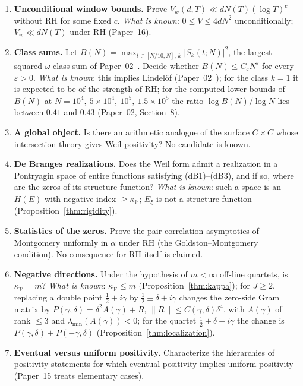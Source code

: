 \documentclass[11pt]{amsart}
\theoremstyle{definition}
\theoremstyle{remark}
\newcommand{\half}{\tfrac{1}{2}}
\newcommand{\om}{\omega}
\newcommand{\gam}{\gamma}
\newcommand{\eps}{\varepsilon}
\newcommand{\kV}{\kappa_{\mathcal V}}
\begin{document}
\begin{enumerate}[label=\textbf{OP\arabic*.}]

\item \textbf{Unconditional window bounds.}
Prove $V_w(d,T)\ll dN(T)(\log T)^c$ without RH for some fixed $c$.
\emph{What is known}: $0\le V\le4dN^2$ unconditionally; $V_w\ll dN(T)$ under RH
(Paper~16).

\item \textbf{Class sums.}
Let $B(N)=\max_{t\in[N/10,N],\,k}|S_k(t;N)|^2$, the largest squared $\om$-class sum of
Paper~02~\cite[Def.~2.3]{P02}. Decide whether $B(N)\le C_\eps N^\eps$ for every $\eps>0$.
\emph{What is known}: this implies Lindel\"of (Paper~02~\cite[Cor.~4.2]{P02}); for the
class $k=1$ it is expected to be of the strength of RH; for the computed lower bounds of $B(N)$ at $N=10^4,\ 5\times10^4,\ 10^5,\ 1.5\times10^5$ the
ratio $\log B(N)/\log N$ lies between $0.41$ and $0.43$ (Paper~02, Section~8).

\item \textbf{A global object.}
Is there an arithmetic analogue of the surface $C\times C$ whose intersection theory gives
Weil positivity? No candidate is known.

\item \textbf{De Branges realizations.}
Does the Weil form admit a realization in a Pontryagin space of entire functions satisfying
\textup{(dB1)--(dB3)}, and if so, where are the zeros of its structure function?
\emph{What is known}: such a space is an $H(E)$ with negative index $\ge\kV$; $E_\xi$ is
not a structure function (Proposition~\ref{thm:rigidity}).

\item \textbf{Statistics of the zeros.}
Prove the pair-correlation asymptotics of Montgomery uniformly in $\alpha$ under RH
(the Goldston--Montgomery condition). No consequence for RH itself is claimed.

\item \textbf{Negative directions.}
Under the hypothesis of $m<\infty$ off-line quartets, is $\kV=m$?
\emph{What is known}: $\kV\le m$ (Proposition~\ref{thm:kappa}); for $J\ge2$, replacing a
double point $\half+i\gam$ by $\half\pm\delta+i\gam$ changes the zero-side Gram matrix by
$P(\gam,\delta)=\delta^2A(\gam)+R$, $\|R\|\le C(\gam,\delta)\delta^4$, with $A(\gam)$ of rank
$\le3$ and $\lambda_{\min}(A(\gam))<0$; for the quartet $\half\pm\delta\pm i\gam$ the change
is $P(\gam,\delta)+P(-\gam,\delta)$ (Proposition~\ref{thm:localization}).

\item \textbf{Eventual versus uniform positivity.}
Characterize the hierarchies of positivity statements for which eventual positivity
implies uniform positivity (Paper~15 treats elementary cases).

\end{enumerate}
\end{document}
